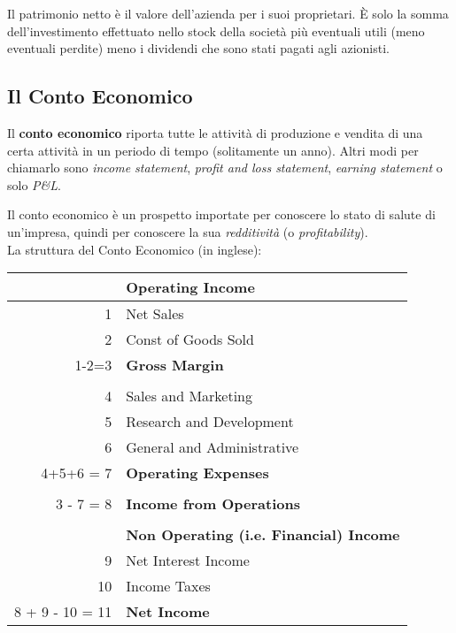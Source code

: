 \documentclass[a4paper,portrait,12pt]{article}
\theoremstyle{definition}
\begin{document}
Il patrimonio netto è il valore dell'azienda per i suoi proprietari. È solo la somma dell'investimento effettuato nello stock della società più eventuali utili (meno eventuali perdite) meno i dividendi che sono stati pagati agli azionisti.


\subsection{Il Conto Economico}


Il \textbf{conto economico} riporta tutte le attività di produzione e vendita di una certa attività in un periodo di tempo (solitamente un anno).
Altri modi per chiamarlo sono \emph{income statement}, \emph{profit and loss statement}, \emph{earning statement} o solo \emph{P\&L}.

Il conto economico è un prospetto importate per conoscere lo stato di salute di un'impresa, quindi per conoscere la sua \emph{redditività} (o \emph{profitability}).\\

La struttura del Conto Economico (in inglese):
\begin{table}[H]
\centering
\begin{tabular}{r|p{.5\linewidth}}
 & \textbf{Operating Income}\\
\hline
1 & Net Sales\\
2 & Const of Goods Sold\\
\hline
1-2=3 & \textbf{Gross Margin}\\
 & \\
4 & Sales and Marketing\\
5 & Research and Development\\
6 & General and Administrative\\
\hline
4+5+6 = 7 & \textbf{Operating Expenses}\\
 & \\
3 - 7 = 8 & \textbf{Income from Operations}\\
& \\
 & \textbf{Non Operating (i.e. Financial) Income}\\
\hline
9 & Net Interest Income\\
10 & Income Taxes\\
\hline
8 + 9 - 10 = 11 & \textbf{Net Income}\\
\hline 
\end{tabular}
\end{table}
\end{document}
